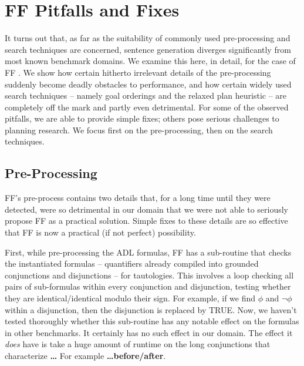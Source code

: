 




\section{FF Pitfalls and Fixes}
\label{sec:crisp-ff}




It turns out that, as far as the suitability of commonly used
pre-processing and search techniques are concerned, sentence
generation diverges significantly from most known benchmark
domains. We examine this here, in detail, for the case of FF
\cite{HoffmannNebel01}. We show how certain hitherto irrelevant
details of the pre-processing suddenly become deadly obstacles to
performance, and how certain widely used search techniques -- namely
goal orderings and the relaxed plan heuristic -- are completely off
the mark and partly even detrimental. For some of the observed
pitfalls, we are able to provide simple fixes; others pose serious
challenges to planning research. We focus first on the pre-processing,
then on the search techniques.













\subsection{Pre-Processing}
\label{sec:crisp-ff:preprocess}







FF's pre-process contains two details that, for a long time until they
were detected, were so detrimental in our domain that we were not able
to seriously propose FF as a practical solution. Simple fixes to these
details are so effective that FF is now a practical (if not perfect)
possibility.



First, while pre-processing the ADL formulas, FF has a sub-routine
that checks the instantiated formulas -- quantifiers already compiled
into grounded conjunctions and disjunctions -- for tautologies. This
involves a loop checking all pairs of sub-formulas within every
conjunction and disjunction, testing whether they are
identical/identical modulo their sign. For example, if we find $\phi$
and $\neg \phi$ within a disjunction, then the disjunction is replaced
by TRUE. Now, we haven't tested thoroughly whether this sub-routine
has any notable effect on the formulas in other benchmarks. It
certainly has no such effect in our domain. The effect it {\em does}
have is take a huge amount of runtime on the long conjunctions that
characterize {\bf \dots} For example {\bf \dots before/after}.



